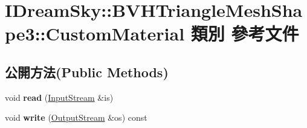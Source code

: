 \hypertarget{class_i_dream_sky_1_1_b_v_h_triangle_mesh_shape3_1_1_custom_material}{}\section{I\+Dream\+Sky\+:\+:B\+V\+H\+Triangle\+Mesh\+Shape3\+:\+:Custom\+Material 類別 參考文件}
\label{class_i_dream_sky_1_1_b_v_h_triangle_mesh_shape3_1_1_custom_material}
\subsection*{公開方法(Public Methods)}
\begin{DoxyCompactItemize}
\item 
void {\bfseries read} (\hyperlink{class_i_dream_sky_1_1_input_stream}{Input\+Stream} \&is)\hypertarget{class_i_dream_sky_1_1_b_v_h_triangle_mesh_shape3_1_1_custom_material_ae4f17c3e653a3798a7669817b1623742}{}\label{class_i_dream_sky_1_1_b_v_h_triangle_mesh_shape3_1_1_custom_material_ae4f17c3e653a3798a7669817b1623742}

\item 
void {\bfseries write} (\hyperlink{class_i_dream_sky_1_1_output_stream}{Output\+Stream} \&os) const \hypertarget{class_i_dream_sky_1_1_b_v_h_triangle_mesh_shape3_1_1_custom_material_a66faa3aef4357e6a59159525663899e4}{}\label{class_i_dream_sky_1_1_b_v_h_triangle_mesh_shape3_1_1_custom_material_a66faa3aef4357e6a59159525663899e4}

\end{DoxyCompactItemize}
